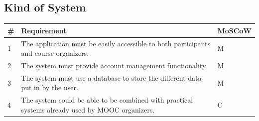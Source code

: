 \subsection{Kind of System}
\begin{tabular}{ | p{0.5cm} | p{12cm} | p{2cm} | }
 \hline
 \textbf{\#} & \textbf{Requirement} & \textbf{MoSCoW} \\ \hline
1 & The application must be easily accessible to both participants and course organizers. & M \\ \hline
2 & The system must provide account management functionality. & M \\ \hline
3 & The system must use a database to store the different data put in by the user. & M \\ \hline
4 & The system could be able to be combined with practical systems already used by MOOC organizers. & C \\
\hline
\end{tabular}

